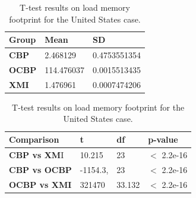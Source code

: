 \documentclass{llncs}
\begin{document}
\begin{table}[ht]
    \centering
    \label{table:ttest_load_memory_wikipedia}
    \caption{T-test results on load memory footprint for the United States case.}
    \begin{minipage}{0.44\textwidth}
        \centering
        \begin{tabular}{|p{}|p{}|p{}|}
            \hline 
            \textbf{Group}  & \textbf{Mean} & \textbf{SD} \\ 
            \hline 
            \textbf{CBP} & 2.468129     & 0.4753551354 \\ 
            \hline 
            \textbf{OCBP} & 114.476037  &  0.0015513435 \\ 
            \hline 
            \textbf{XMI} &  1.476961  &  0.0007474206 \\ 
            \hline 
        \end{tabular} 
    \end{minipage}
    \hfill
    \begin{minipage}{0.54\textwidth}
        \centering
        \begin{tabular}{|p{}|p{}|p{}|p{}|}
            \hline 
            \textbf{Comparison} & \textbf{t}  & \textbf{df} & \textbf{p-value} \\ 
            \hline 
            \textbf{CBP vs XM}I & 10.215   &23 & $<$ 2.2e-16 \\ 
            \hline 
            \textbf{CBP vs OCBP} & -1154.3, &23 & $<$ 2.2e-16 \\ 
            \hline 
            \textbf{OCBP vs XMI} &321470  &33.132 & $<$ 2.2e-16 \\ 
            \hline 
        \end{tabular} 
    \end{minipage}
\end{table}
   
\end{document}
